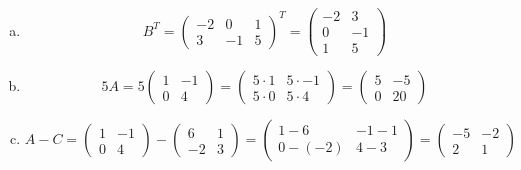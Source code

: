 \documentclass[12pt,letterpaper]{exam}
\begin{document}
\begin{questions}
\sol 
\begin{enumerate}[(a)]
\item 
	\[
	B^T= \begin{pmatrix} -2 & 0 & 1 \\ 3 & -1 & 5 \end{pmatrix}^T= \begin{pmatrix} -2 & 3 \\ 0 & -1 \\ 1 & 5 \end{pmatrix}
	\] \pspace

\item 
	\[
	5A= 5\begin{pmatrix} 1 & -1 \\ 0 & 4 \end{pmatrix}= \begin{pmatrix} 5 \cdot 1 & 5 \cdot -1 \\ 5 \cdot 0 & 5 \cdot 4 \end{pmatrix}= \begin{pmatrix} 5 & -5 \\ 0 & 20 \end{pmatrix}
	\] \pspace

\item 
	\[
	A - C= \begin{pmatrix} 1 & -1 \\ 0 & 4 \end{pmatrix} - \begin{pmatrix} 6 & 1 \\ -2 & 3 \end{pmatrix}= \begin{pmatrix} 1 - 6 & -1 - 1 \\ 0 - (-2) & 4 - 3 \end{pmatrix}= \begin{pmatrix} -5 & -2 \\ 2 & 1 \end{pmatrix}
	\] \pspace


\end{enumerate}
\end{questions}
\end{document}
